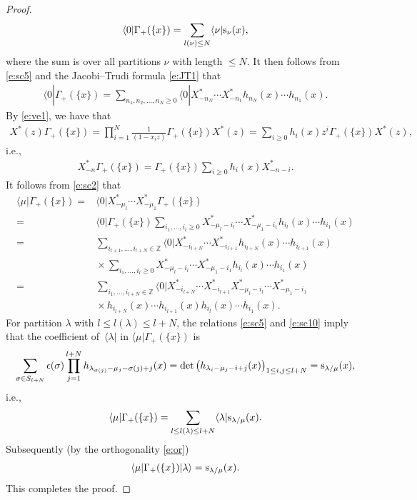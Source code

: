 \documentclass[pdftex]{sigma}
\numberwithin{equation}{section}
\begin{document}
\begin{proof}
\begin{align}
\langle0|\Gamma_+(\{x\})=\sum_{\substack{l(\nu)\leq N}}\langle\nu|{\rm s}_\nu(x),
\end{align}
where the sum is over all partitions $\nu$ with length $\leq N$. It then follows from \eqref{e:sc5} and the Jacobi--Trudi formula \eqref{e:JT1} that
\begin{align*}%
\langle0|\Gamma_+(\{x\})=\sum_{n_1,n_2,\dots,n_N\geq 0}\langle 0|X^*_{-n_N}\cdots X^*_{-n_1}h_{n_N}(x)\cdots h_{n_1}(x).
\end{align*}
By \eqref{e:ve1}, we have that
\begin{align*}
X^{*}(z)\Gamma_+(\{x\})=\prod^N_{i=1}\frac{1}{(1-x_iz)}\Gamma_+(\{x\})X^{*}(z)
=\sum_{i\geq 0}h_i(x)z^i\Gamma_+(\{x\})X^{*}(z),
\end{align*}
 i.e.,
\begin{align*}
X^{*}_{-n}\Gamma_+(\{x\}) = \Gamma_+(\{x\})\sum_{i\geq 0}h_i(x)X^{*}_{-n-i}.
\end{align*}
It follows from \eqref{e:sc2} that
\begin{align}
\langle\mu|\Gamma_+(\{x\})={}& \langle0|X^{*}_{-\mu_l}\cdots X^{*}_{-\mu_1}\Gamma_+(\{x\}) \nonumber\\
={}& \langle0|\Gamma_+(\{x\})\sum_{i_1,\dots,i_l\geq 0}X^{*}_{-\mu_l-i_l}\cdots X^{*}_{-\mu_1-i_1}h_{i_l}(x)\cdots h_{i_1}(x)\nonumber\\
={}& \sum_{i_{l+1},\dots,i_{l+N}\in\mathbb{Z}}\langle 0|X^*_{-i_{l+N}}\cdots X^*_{-i_{l+1}}h_{i_{l+N}}(x)\cdots h_{i_{l+1}}(x)\nonumber\\
&{}\times \sum_{i_1,\dots,i_l\geq 0}X^{*}_{-\mu_l-i_l}\cdots X^{*}_{-\mu_1-i_1}h_{i_l}(x)\cdots h_{i_1}(x)\nonumber\\
={}& \sum_{i_1,\dots,i_{l+N}\in\mathbb{Z}}\langle 0|X^*_{-i_{l+N}}\cdots X^*_{-i_{l+1}}X^{*}_{-\mu_l-i_l}\cdots X^{*}_{-\mu_1-i_1}\nonumber\\
 &{}\times h_{i_{l+N}}(x)\cdots h_{i_{l+1}}(x)h_{i_l}(x)\cdots h_{i_1}(x).\label{e:sc10}
\end{align}
For partition $\lambda$ with $l\leq l(\lambda)\leq l+N$, the relations \eqref{e:sc5} and \eqref{e:sc10} imply that the coefficient of~$\langle\lambda|$ in $\langle\mu|\Gamma_+(\{x\})$ is
\begin{align*}
\sum_{\sigma\in S_{l+N}}\epsilon(\sigma)\prod^{l+N}_{j=1}h_{\lambda_{\sigma(j)}-\mu_j-\sigma(j)+j}(x) = \det\big(h_{\lambda_i-\mu_j-i+j}(x)\big)_{1\leq i,j\leq l+N} = {\rm s}_{\lambda/\mu}(x),
\end{align*}
i.e.,
\begin{align*}
\langle\mu|\Gamma_+(\{x\}) = \sum_{\substack{l\leq l(\lambda)\leq l+N}}\langle\lambda|{\rm s}_{\lambda/\mu}(x).
\end{align*}
Subsequently (by the orthogonality \eqref{e:or})
\begin{align*}
\langle\mu|\Gamma_+(\{x\})|\lambda\rangle = {\rm s}_{\lambda/\mu}(x).
\end{align*}
This completes the proof.
\end{proof}
\end{document}
